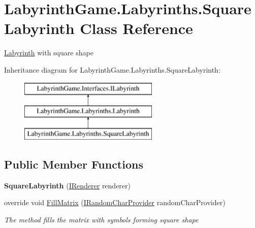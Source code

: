 \hypertarget{class_labyrinth_game_1_1_labyrinths_1_1_square_labyrinth}{\section{Labyrinth\+Game.\+Labyrinths.\+Square\+Labyrinth Class Reference}
\label{class_labyrinth_game_1_1_labyrinths_1_1_square_labyrinth}
}


\hyperlink{class_labyrinth_game_1_1_labyrinths_1_1_labyrinth}{Labyrinth} with square shape  


Inheritance diagram for Labyrinth\+Game.\+Labyrinths.\+Square\+Labyrinth\+:\begin{figure}[H]
\begin{center}
\leavevmode
\includegraphics[height=3.000000cm]{class_labyrinth_game_1_1_labyrinths_1_1_square_labyrinth}
\end{center}
\end{figure}
\subsection*{Public Member Functions}
\begin{DoxyCompactItemize}
\item 
\hypertarget{class_labyrinth_game_1_1_labyrinths_1_1_square_labyrinth_a9db3074cf958a1a27556bfe99bc1086f}{{\bfseries Square\+Labyrinth} (\hyperlink{interface_labyrinth_game_1_1_interfaces_1_1_i_renderer}{I\+Renderer} renderer)}\label{class_labyrinth_game_1_1_labyrinths_1_1_square_labyrinth_a9db3074cf958a1a27556bfe99bc1086f}

\item 
override void \hyperlink{class_labyrinth_game_1_1_labyrinths_1_1_square_labyrinth_abd26adbb694f70d8de8eb6239b90ef27}{Fill\+Matrix} (\hyperlink{interface_labyrinth_game_1_1_interfaces_1_1_i_random_char_provider}{I\+Random\+Char\+Provider} random\+Char\+Provider)
\begin{DoxyCompactList}\small\item\em The method fills the matrix with symbols forming square shape \end{DoxyCompactList}\end{DoxyCompactItemize}
